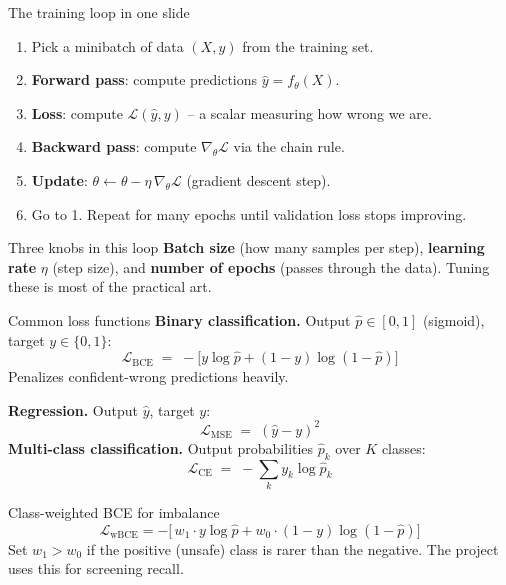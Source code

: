 \documentclass[aspectratio=169,10pt]{beamer}
\begin{document}
\begin{frame}{The training loop in one slide}
\begin{enumerate}
  \item Pick a minibatch of data $(X, y)$ from the training set.
  \item \textbf{Forward pass}: compute predictions $\hat{y} = f_\theta(X)$.
  \item \textbf{Loss}: compute $\mathcal{L}(\hat{y}, y)$ -- a scalar measuring how wrong we are.
  \item \textbf{Backward pass}: compute $\nabla_\theta \mathcal{L}$ via the chain rule.
  \item \textbf{Update}: $\theta \leftarrow \theta - \eta \, \nabla_\theta \mathcal{L}$ (gradient descent step).
  \item Go to 1. Repeat for many epochs until validation loss stops improving.
\end{enumerate}
\vspace{0.6em}
\begin{block}{Three knobs in this loop}
\textbf{Batch size} (how many samples per step), \textbf{learning rate} $\eta$ (step size), and \textbf{number of epochs} (passes through the data). Tuning these is most of the practical art.
\end{block}
\end{frame}

\begin{frame}{Common loss functions}
\textbf{Binary classification.} Output $\hat{p} \in [0,1]$ (sigmoid), target $y \in \{0,1\}$:
\begin{equation*}
\mathcal{L}_{\text{BCE}} \;=\; -\bigl[y \log \hat{p} + (1-y) \log(1-\hat{p})\bigr]
\end{equation*}
Penalizes confident-wrong predictions heavily.
\vspace{0.4em}

\textbf{Regression.} Output $\hat{y}$, target $y$:
\begin{equation*}
\mathcal{L}_{\text{MSE}} \;=\; (\hat{y} - y)^2
\end{equation*}
\textbf{Multi-class classification.} Output probabilities $\hat{p}_k$ over $K$ classes:
\begin{equation*}
\mathcal{L}_{\text{CE}} \;=\; -\sum_k y_k \log \hat{p}_k
\end{equation*}
\vspace{0.2em}
\begin{block}{Class-weighted BCE for imbalance}
\begin{equation*}
\mathcal{L}_{\text{wBCE}} = -\bigl[\,w_1 \cdot y \log \hat{p} + w_0 \cdot (1-y) \log(1-\hat{p})\bigr]
\end{equation*}
Set $w_1 > w_0$ if the positive (unsafe) class is rarer than the negative. The project uses this for screening recall.
\end{block}
\end{frame}
\end{document}
